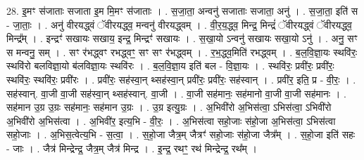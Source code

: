 \documentclass[17pt]{extarticle}
\begin{document}
28. इ॒मꣳ स॑जाताः सजाता इ॒म मि॒मꣳ स॑जाताः । . स॒जा॒ता॒ अन्वनु॑ सजाताः सजाता॒ अनु॑ । . स॒जा॒ता॒ इति॑ स - जा॒ताः॒ । . अनु॑ वीरयद्ध्वं ॅवीरयद्ध्व॒ मन्वनु॑ वीरयद्ध्वम् । . वी॒र॒य॒द्ध्व॒ मिन्द्र॒ मिन्द्रं॑ ॅवीरयद्ध्वं ॅवीरयद्ध्व॒ मिन्द्र᳚म् । . इन्द्रꣳ॑ सखायः सखाय॒ इन्द्र॒ मिन्द्रꣳ॑ सखायः । . स॒खा॒यो ऽन्वनु॑ सखायः सखा॒यो ऽनु॑ । . अनु॒ सꣳ स मन्वनु॒ सम् । . सꣳ र॑भद्ध्वꣳ रभद्ध्वꣳ॒॒ सꣳ सꣳ र॑भद्ध्वम् । . र॒भ॒द्ध्व॒मिति॑ रभद्ध्वम् । . ब॒ल॒वि॒ज्ञा॒यः स्थवि॑रः॒ स्थवि॑रो बलविज्ञा॒यो ब॑लविज्ञा॒यः स्थवि॑रः । . ब॒ल॒वि॒ज्ञा॒य इति॑ बल - वि॒ज्ञा॒यः । . स्थवि॑रः॒ प्रवी॑रः॒ प्रवी॑रः॒ स्थवि॑रः॒ स्थवि॑रः॒ प्रवी॑रः । . प्रवी॑रः॒ सह॑स्वा॒न् थ्सह॑स्वा॒न् प्रवी॑रः॒ प्रवी॑रः॒ सह॑स्वान् । . प्रवी॑र॒ इति॒ प्र - वी॒रः॒ । . सह॑स्वान्. वा॒जी वा॒जी सह॑स्वा॒न् थ्सह॑स्वान्. वा॒जी । . वा॒जी सह॑मानः॒ सह॑मानो वा॒जी वा॒जी सह॑मानः । . सह॑मान उ॒ग्र उ॒ग्रः सह॑मानः॒ सह॑मान उ॒ग्रः । . उ॒ग्र इत्यु॒ग्रः । . अ॒भिवी॑रो अ॒भिस॑त्वा॒ ऽभिस॑त्वा॒ ऽभिवी॑रो अ॒भिवी॑रो अ॒भिस॑त्वा । . अ॒भिवी॑र॒ इत्य॒भि - वी॒रः॒ । . अ॒भिस॑त्वा सहो॒जाः स॑हो॒जा अ॒भिस॑त्वा॒ ऽभिस॑त्वा सहो॒जाः । . अ॒भिस॒त्वेत्य॒भि - स॒त्वा॒ । . स॒हो॒जा जैत्र॒म् जैत्रꣳ॑ सहो॒जाः स॑हो॒जा जैत्र᳚म् । . स॒हो॒जा इति॑ सहः - जाः । . जैत्र॑ मिन्द्रेन्द्र॒ जैत्र॒म् जैत्र॑ मिन्द्र । . इ॒न्द्र॒ रथꣳ॒॒ रथ॑ मिन्द्रेन्द्र॒ रथ᳚म् । \newline
\end{document}
